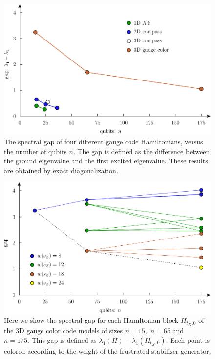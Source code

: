 \begin{figure}
\begin{center}
\includegraphics[width=1.0\columnwidth]{pic-gap.pdf}
\caption{The spectral gap of four different gauge code Hamiltonians, versus the number
of qubits $n$. The gap is defined as the difference between
the ground eigenvalue and the first excited eigenvalue.
These results are obtained by exact diagonalization.
}
\label{PicGap}
\end{center}
\end{figure}

\begin{figure}
\begin{center}
\includegraphics[width=1.0\columnwidth]{pic-gap-stabs.pdf}
\caption{
Here we show the spectral gap
for each Hamiltonian block $H_{t_X,0}$
of the 3D gauge color code models of sizes $n=15,$ $n=65$ and $n=175.$
This gap is defined as $\lambda_1(H) - \lambda_1(H_{t_X,0}).$
Each point is colored according to the weight of the
frustrated stabilizer generator.
}
\label{PicGapStabs}
\end{center}
\end{figure}


